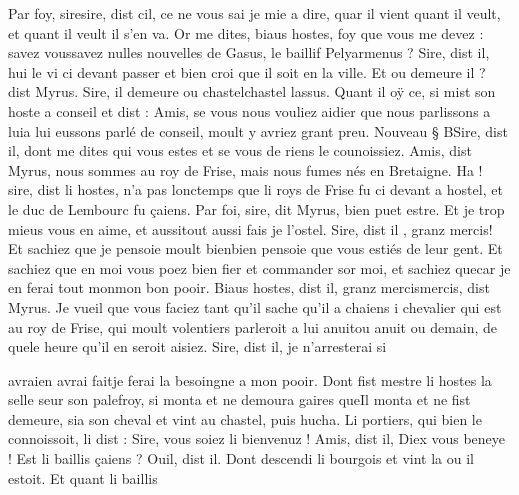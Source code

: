 \documentclass{article}
\begin{document}
\begin{pages}
                     Par foy, 
                     siresire, dist cil, ce ne vous sai je mie a dire, quar il vient quant il veult, et quant il
                  veult il s’en va.
               Or me dites, biaus hostes, foy que vous me devez : 
                     savez voussavez nulles nouvelles de Gasus, le baillif
                     Pelyarmenus ? 
               Sire, dist il, hui le vi ci devant passer et bien
                  croi que il soit en la ville.
               Et ou demeure il ? dist Myrus.
               Sire, 
                     il demeure ou 
                     chastelchastel lassus. Quant il oÿ ce, si mist son
                  hoste a conseil et dist : Amis, se vous nous
                  vouliez aidier que nous 
                     parlissons a luia lui eussons parlé de conseil, moult y avriez grant preu.
               Nouveau § BSire, dist
                  il, dont me dites qui vous estes et se vous de riens le counoissiez.
               Amis, dist Myrus,
                  nous sommes au roy de Frise, mais nous fumes nés en Bretaigne.
               Ha ! sire, dist li
                     hostes, n’a pas lonctemps que li roys de
                        Frise fu ci devant a hostel, et le duc de Lembourc fu çaiens.
               Par foi, sire, dit Myrus, bien puet estre. Et je trop mieus vous en aime, et 
                     aussitout aussi fais je l’ostel.
               Sire, dist il , granz mercis! Et sachiez que je 
                     pensoie moult bienbien pensoie que vous estiés de leur gent. Et
                  sachiez que en moi vous poez bien fier et commander sor moi, 
                     et sachiez quecar je en ferai 
                     tout monmon bon pooir.
               Biaus hostes,
                     dist il, granz 
                     mercismercis, dist Myrus. Je vueil que vous faciez tant qu’il sache qu’il a chaiens i
                  chevalier qui est au roy de Frise, qui moult volentiers parleroit a lui 
                     anuitou anuit ou demain, de quele heure qu’il en seroit aisiez. 
               Sire, dist il,
                     je n’arresterai si

                           avraien avrai faitje ferai la besoingne a mon pooir. Dont fist mestre li hostes la selle 
                  seur son palefroy, 
                        si monta et ne demoura gaires queIl monta et ne fist demeure, sia son cheval et vint au chastel, puis hucha. Li
               portiers, qui bien le connoissoit, 
                  li dist : Sire, vous soiez
                        li bienvenuz !
               Amis, dist il, Diex vous beneye ! Est li baillis
                  çaiens ?
               Ouil, dist il. Dont descendi li bourgois et vint la ou il estoit. Et quant li baillis
               

\end{pages}
\end{document}
